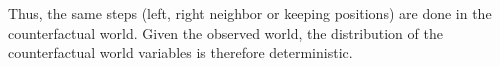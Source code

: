 \begin{example}
    Thus, the same steps (left, right neighbor or keeping positions) are done in the counterfactual world.
    Given the observed world, the distribution of the counterfactual world variables is therefore deterministic.



\end{example}